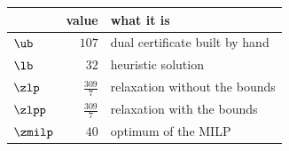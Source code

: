 \begin{center}\small
\begin{tabular}{lrl}
\toprule
 & value & what it is \\
\midrule
$\ub$ & $107$ & dual certificate built by hand \\
$\lb$ & $32$ & heuristic solution \\
$\zlp$ & $\frac{309}{7}$ & relaxation without the bounds \\
$\zlpp$ & $\frac{309}{7}$ & relaxation with the bounds \\
$\zmilp$ & $40$ & optimum of the MILP \\
\bottomrule
\end{tabular}
\end{center}
